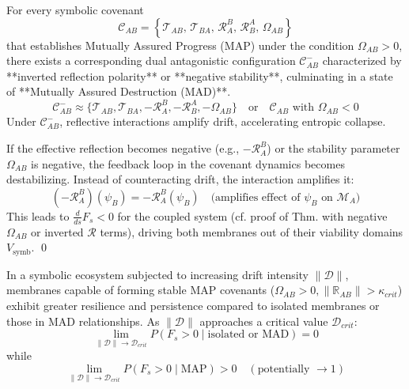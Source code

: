 \begin{proposition}
\label{prop:bk5_map_mad_dichotomy}
For every symbolic covenant
\[
\mathcal{C}_{AB} = \left\{ \mathcal{T}_{AB},\, \mathcal{T}_{BA},\, \mathcal{R}_A^B,\, \mathcal{R}_B^A,\, \Omega_{AB} \right\}
\]
that establishes Mutually Assured Progress (MAP) under the condition \( \Omega_{AB} > 0 \),
there exists a corresponding dual antagonistic configuration \( \mathcal{C}_{AB}^{-} \)
characterized by **inverted reflection polarity** or **negative stability**, culminating in a
state of **Mutually Assured Destruction (MAD)**.
\begin{equation}
\mathcal{C}_{AB}^{-} \approx \{\mathcal{T}_{AB}, \mathcal{T}_{BA}, -\mathcal{R}_A^B, -\mathcal{R}_B^A, -\Omega_{AB}\} \quad \text{or} \quad \mathcal{C}_{AB} \text{ with } \Omega_{AB} < 0
\end{equation}
Under $\mathcal{C}_{AB}^{-}$, reflective interactions amplify drift, accelerating entropic collapse.
\end{proposition}
\begin{demonstratio}
\label{demonstratio:bk5_negative_reflection_instability}
If the effective reflection becomes negative (e.g., $-\mathcal{R}_A^B$) or the stability parameter $\Omega_{AB}$ is negative, the feedback loop in the covenant dynamics becomes destabilizing. Instead of counteracting drift, the interaction amplifies it:
\begin{equation}
(-\mathcal{R}_A^B)(\psi_B) = -\mathcal{R}_A^B(\psi_B) \quad \text{(amplifies effect of } \psi_B \text{ on } \mathscr{M}_A)
\end{equation}
This leads to $\frac{d}{ds}F_s < 0$ for the coupled system (cf. proof of Thm.  with negative $\Omega_{AB}$ or inverted $\mathcal{R}$ terms), driving both membranes out of their viability domains $V_{\text{symb}}$. \qed
\end{demonstratio}
\begin{theorem}
\label{theorem:bk5__map_dominance}
In a symbolic ecosystem subjected to increasing drift intensity $\|\mathcal{D}\|$, membranes capable of forming stable MAP covenants ($\Omega_{AB}>0, \|\mathbb{R}_{AB}\| > \kappa_{crit}$) exhibit greater resilience and persistence compared to isolated membranes or those in MAD relationships. As $\|\mathcal{D}\|$ approaches a critical value $\mathcal{D}_{crit}$:
\begin{equation}
\lim_{\|\mathcal{D}\| \to \mathcal{D}_{crit}} P(F_s > 0 \mid \text{isolated or MAD}) = 0
\end{equation}
while
\begin{equation}
\lim_{\|\mathcal{D}\| \to \mathcal{D}_{crit}} P(F_s > 0 \mid \text{MAP}) > 0 \quad (\text{potentially } \to 1)
\end{equation}
\end{theorem}
